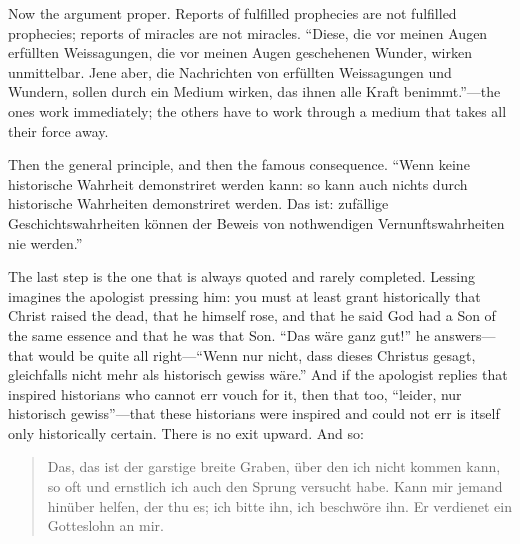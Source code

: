 Now the argument proper. Reports of fulfilled prophecies are not fulfilled prophecies; reports of miracles are not miracles. ``Diese, die vor meinen Augen erf\"ullten Weissagungen, die vor meinen Augen geschehenen Wunder, wirken unmittelbar. Jene aber, die Nachrichten von erf\"ullten Weissagungen und Wundern, sollen durch ein Medium wirken, das ihnen alle Kraft benimmt.''---the ones work immediately; the others have to work through a medium that takes all their force away.

Then the general principle, and then the famous consequence. ``Wenn keine historische Wahrheit demonstriret werden kann: so kann auch nichts durch historische Wahrheiten demonstriret werden. Das ist: zuf\"allige Geschichtswahrheiten k\"onnen der Beweis von nothwendigen Vernunftswahrheiten nie werden.''

The last step is the one that is always quoted and rarely completed. Lessing imagines the apologist pressing him: you must at least grant historically that Christ raised the dead, that he himself rose, and that he said God had a Son of the same essence and that he was that Son. ``Das w\"are ganz gut!'' he answers---that would be quite all right---``Wenn nur nicht, dass dieses Christus gesagt, gleichfalls nicht mehr als historisch gewiss w\"are.'' And if the apologist replies that inspired historians who cannot err vouch for it, then that too, ``leider, nur historisch gewiss''---that these historians were inspired and could not err is itself only historically certain. There is no exit upward. And so:

\begin{quote}\small
Das, das ist der garstige breite Graben, \"uber den ich nicht kommen kann, so oft und ernstlich ich auch den Sprung versucht habe. Kann mir jemand hin\"uber helfen, der thu es; ich bitte ihn, ich beschw\"ore ihn. Er verdienet ein Gotteslohn an mir.
\end{quote}

